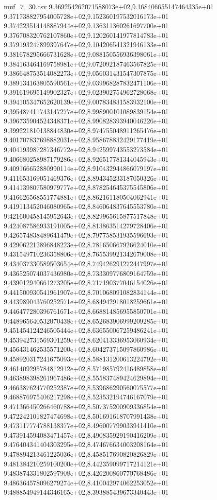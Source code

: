 \begin{filecontents*}{muf_7_30.csv}
9.369254262071588073e+02,9.168406655147464335e+01
9.371738827954005728e+02,9.152360197532016173e+01
9.374223514148887944e+02,9.136311360261697700e+01
9.376708320762107860e+02,9.120260141977814783e+01
9.379193247899397647e+02,9.104206541321946133e+01
9.381678295666731628e+02,9.088150556936398061e+01
9.384163464169758981e+02,9.072092187463567825e+01
9.386648753514082273e+02,9.056031431547307875e+01
9.389134163805590561e+02,9.039968287832471106e+01
9.391619695149902327e+02,9.023902754962728068e+01
9.394105347652620139e+02,9.007834831583932100e+01
9.395487411743147277e+02,8.998900101089839154e+01
9.396735904524348371e+02,8.990828393940046226e+01
9.399221810138844830e+02,8.974755048911265476e+01
9.401707837698882031e+02,8.958678832429177419e+01
9.404193987287346772e+02,8.942599743553273584e+01
9.406680258987179286e+02,8.926517781344045943e+01
9.409166652880990114e+02,8.910432944866079197e+01
9.411653169051469376e+02,8.894345233187050326e+01
9.414139807580979777e+02,8.878254645375545806e+01
9.416626568551774881e+02,8.862161180504062941e+01
9.419113452046080965e+02,8.846064837645553780e+01
9.421600458145952643e+02,8.829965615877517848e+01
9.424087586933191005e+02,8.813863514279728406e+01
9.426574838489641479e+02,8.797758531935596693e+01
9.429062212896848223e+02,8.781650667926624010e+01
9.431549710236358806e+02,8.765539921342679008e+01
9.434037330589503654e+02,8.749426291272447997e+01
9.436525074037436980e+02,8.733309776809164759e+01
9.439012940661273205e+02,8.717190377046154026e+01
9.441500930541961907e+02,8.701068091082834144e+01
9.443989043760252571e+02,8.684942918018259661e+01
9.446477280396761671e+02,8.668814856955850701e+01
9.448965640532070438e+02,8.652683906999209285e+01
9.451454124246505444e+02,8.636550067259486241e+01
9.453942731569301259e+02,8.620413336953060934e+01
9.456431462535571200e+02,8.604273715097860986e+01
9.458920317241675093e+02,8.588131200613224792e+01
9.461409295784812912e+02,8.571985792416489858e+01
9.463898398261967486e+02,8.555837489424629894e+01
9.466387624770252387e+02,8.539686290560075577e+01
9.468876975406217298e+02,8.523532194746167079e+01
9.471366450266460788e+02,8.507375200909336854e+01
9.472242101827474698e+02,8.501691618707991438e+01
9.473117774788138377e+02,8.496007799033941410e+01
9.473914594083471457e+02,8.490835929190416209e+01
9.476404341404303295e+02,8.474676634003208164e+01
9.478894213461225036e+02,8.458517690820826829e+01
9.481384210259100200e+02,8.442359099717214121e+01
9.483874331802597908e+02,8.426200860770768486e+01
9.486364578096279274e+02,8.410042974062253052e+01
9.488854949144346165e+02,8.393885439673340443e+01

\end{filecontents*}
